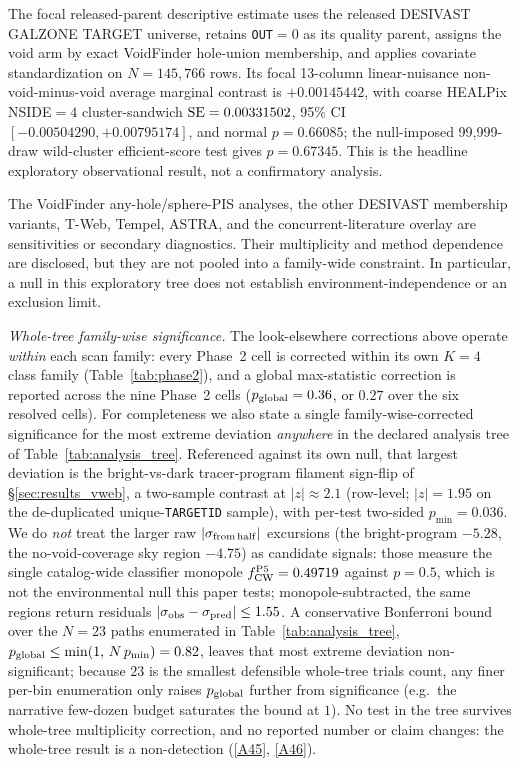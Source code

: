 \documentclass[twocolumn,linenumbers]{aastex702}
\newcommand{\repoBase}{https://github.com/Hubify-Projects/bigbounce/blob/main}
\begin{document}
The focal released-parent descriptive estimate uses the released DESIVAST
GALZONE TARGET universe, retains \texttt{OUT}$=0$ as its quality parent,
assigns the void arm by exact VoidFinder hole-union membership, and applies
covariate standardization
on $N=145{,}766$ rows. Its focal 13-column linear-nuisance
non-void-minus-void average marginal contrast is $+0.00145442$, with
coarse HEALPix NSIDE$=4$ cluster-sandwich ${\rm SE}=0.00331502$, 95\% CI
$[-0.00504290,+0.00795174]$, and normal $p=0.66085$; the null-imposed
99,999-draw wild-cluster efficient-score test gives $p=0.67345$.
This is the headline exploratory observational result, not a
confirmatory analysis.

The VoidFinder any-hole/sphere-PIS analyses, the other DESIVAST
membership variants, T-Web, Tempel, ASTRA, and the concurrent-literature
overlay are sensitivities or secondary diagnostics. Their multiplicity
and method dependence are disclosed, but they are not pooled into a
family-wide constraint. In particular, a null in this exploratory tree
does not establish environment-independence or an exclusion limit.

\emph{Whole-tree family-wise significance.} The look-elsewhere
corrections above operate \emph{within} each scan family: every Phase~2
cell is corrected within its own $K\!=\!4$ class family
(Table~\ref{tab:phase2}), and a global max-statistic correction is
reported across the nine Phase~2 cells ($p_{\rm global}=0.36$, or
$0.27$ over the six resolved cells). For completeness we also state a
single family-wise-corrected significance for the most extreme
deviation \emph{anywhere} in the declared analysis tree of
Table~\ref{tab:analysis_tree}. Referenced against its own null, that
largest deviation is the bright-vs-dark tracer-program filament
sign-flip of \S\ref{sec:results_vweb}, a two-sample contrast at
$|z|\!\approx\!2.1$ (row-level; $|z|=1.95$ on the de-duplicated
unique-\texttt{TARGETID} sample), with per-test two-sided
$p_{\min}=0.036$. We do \emph{not} treat the larger raw
$|\sigma_{\rm from\,half}|$ excursions (the bright-program $-5.28$, the
no-void-coverage sky region $-4.75$) as candidate signals: those
measure the single catalog-wide classifier monopole
$f_{\rm CW}^{\rm P5}=0.49719$ against $p=0.5$, which is not the
environmental null this paper tests; monopole-subtracted, the same
regions return residuals $|\sigma_{\rm obs}-\sigma_{\rm pred}|\le1.55$.
A conservative Bonferroni bound over the $N=23$ paths enumerated in
Table~\ref{tab:analysis_tree},
$p_{\rm global}\le\min(1,\,N\,p_{\min})=0.82$, leaves that most extreme
deviation non-significant; because $23$ is the smallest defensible
whole-tree trials count, any finer per-bin enumeration only raises
$p_{\rm global}$ further from significance (e.g.\ the narrative
few-dozen budget saturates the bound at $1$). No test in the tree
survives whole-tree multiplicity correction, and no reported number or
claim changes: the whole-tree result is a non-detection
(\href{\repoBase/pipelines/p5\_desi\_chirality/analysis/global\_multiplicity\_bound\_v0\_1\_140.py}{[A45]},
\href{\repoBase/pipelines/p5\_desi\_chirality/analysis/global\_multiplicity\_bound\_v0\_1\_140.json}{[A46]}).
\end{document}
